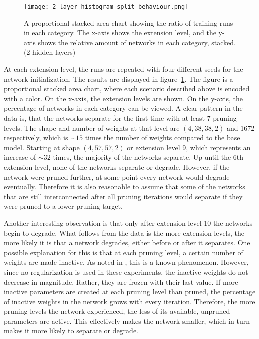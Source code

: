 \begin{figure}[t] %
    \centering
    \texttt{[image: 2-layer-histogram-split-behaviour.png]}
    \caption[Separation/Degradation Stacked Area Chart (2 hidden layers)]{
        A proportional stacked area chart showing the ratio of training runs in each category.
        The x-axis shows the extension level, and the y-axis shows the relative amount of networks in each category, stacked. (2 hidden layers)
        }\label{fig:2laxer-histogram}
\end{figure}

At each extension level, the runs are repeated with four different seeds for the network initialization.
The results are displayed in figure~\ref{fig:2laxer-histogram}.
The figure is a proportional stacked area chart, where each scenario described above is encoded with a color.
On the x-axis, the extension levels are shown.
On the y-axis, the percentage of networks in each category can be viewed.
A clear pattern in the data is, that the networks separate for the first time with at least 7 pruning levels.
The shape and number of weights at that level are $(4,38,38,2)$ and 1672 respectively, which is $\sim15$ times the number of weights compared to the base model. 
Starting at shape $(4,57,57,2)$ or extension level 9, which represents an increase of $\sim32$-times, the majority of the networks separate.
Up until the 6th extension level, none of the networks separate or degrade. 
However, if the network were pruned further, at some point every network would degrade eventually.
Therefore it is also reasonable to assume that some of the networks that are still interconnected after all pruning iterations would separate if they were pruned to a lower pruning target.

Another interesting observation is that only after extension level 10 the networks begin to degrade.
What follows from the data is the more extension levels, the more likely it is that a network degrades, either before or after it separates.
One possible explanation for this is that at each pruning level, a certain number of weights are made inactive.
As noted in \autocite{HanEtAl15, AllAlivePruning}, this is a known phenomenon.
However, since no regularization is used in these experiments, the inactive weights do not decrease in magnitude.
Rather, they are frozen with their last value.
If more inactive parameters are created at each pruning level than pruned, the percentage of inactive weights in the network grows with every iteration.
Therefore, the more pruning levels the network experienced, the less of its available, unpruned parameters are active.
This effectively makes the network smaller, which in turn makes it more likely to separate or degrade.

